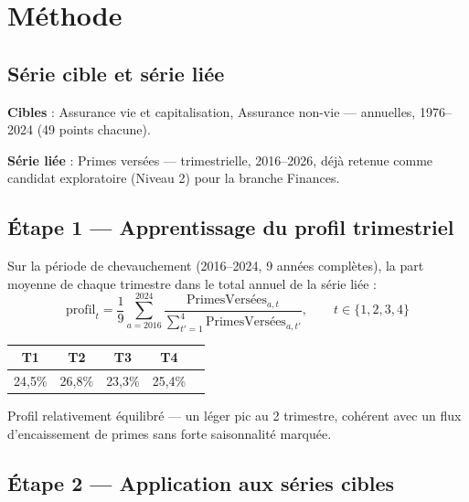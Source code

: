 \documentclass[11pt,a4paper]{article}
\begin{document}
\section{Méthode}

\subsection{Série cible et série liée}

\begin{fichebox}
\textbf{Cibles} : Assurance vie et capitalisation, Assurance non-vie --- annuelles, 1976--2024 (49 points chacune).

\textbf{Série liée} : Primes versées --- trimestrielle, 2016--2026, déjà retenue comme candidat exploratoire (Niveau 2) pour la branche Finances.
\end{fichebox}

\subsection{Étape 1 --- Apprentissage du profil trimestriel}

Sur la période de chevauchement (2016--2024, 9 années complètes), la part moyenne de chaque trimestre dans le total annuel de la série liée :
\begin{equation}
\text{profil}_t = \frac{1}{9}\sum_{a=2016}^{2024} \frac{\text{PrimesVersées}_{a,t}}{\sum_{t'=1}^{4}\text{PrimesVersées}_{a,t'}}, \qquad t\in\{1,2,3,4\}
\end{equation}

\begin{fichebox}
\begin{center}
\begin{tabular}{ccccc}
\toprule
T1 & T2 & T3 & T4 \\
\midrule
24,5\% & 26,8\% & 23,3\% & 25,4\% \\
\bottomrule
\end{tabular}
\end{center}
Profil relativement équilibré --- un léger pic au 2 trimestre, cohérent avec un flux d'encaissement de primes sans forte saisonnalité marquée.
\end{fichebox}

\subsection{Étape 2 --- Application aux séries cibles}
\end{document}
